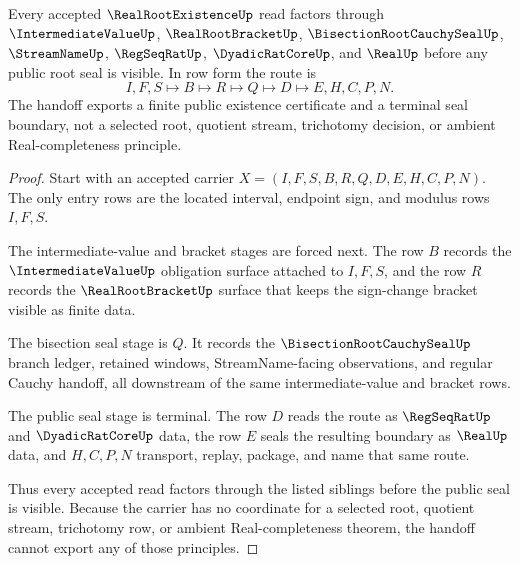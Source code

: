 \begin{theorem}\label{thm:real-root-existence-bisection-seal-handoff}
Every accepted $\RealRootExistenceUp$ read factors through $\IntermediateValueUp$, $\RealRootBracketUp$, $\BisectionRootCauchySealUp$, $\StreamNameUp$, $\RegSeqRatUp$, $\DyadicRatCoreUp$, and $\RealUp$ before any public root seal is visible. In row form the route is
$$
I,F,S \longmapsto B \longmapsto R \longmapsto Q \longmapsto D \longmapsto E,H,C,P,N .
$$
The handoff exports a finite public existence certificate and a terminal seal boundary, not a selected root, quotient stream, trichotomy decision, or ambient Real-completeness principle.
\end{theorem}
\begin{proof}
Start with an accepted carrier $X=(I,F,S,B,R,Q,D,E,H,C,P,N)$. The only entry rows are the located interval, endpoint sign, and modulus rows $I,F,S$.

The intermediate-value and bracket stages are forced next. The row $B$ records the $\IntermediateValueUp$ obligation surface attached to $I,F,S$, and the row $R$ records the $\RealRootBracketUp$ surface that keeps the sign-change bracket visible as finite data.

The bisection seal stage is $Q$. It records the $\BisectionRootCauchySealUp$ branch ledger, retained windows, StreamName-facing observations, and regular Cauchy handoff, all downstream of the same intermediate-value and bracket rows.

The public seal stage is terminal. The row $D$ reads the route as $\RegSeqRatUp$ and $\DyadicRatCoreUp$ data, the row $E$ seals the resulting boundary as $\RealUp$ data, and $H,C,P,N$ transport, replay, package, and name that same route.

Thus every accepted read factors through the listed siblings before the public seal is visible. Because the carrier has no coordinate for a selected root, quotient stream, trichotomy row, or ambient Real-completeness theorem, the handoff cannot export any of those principles.
\end{proof}


